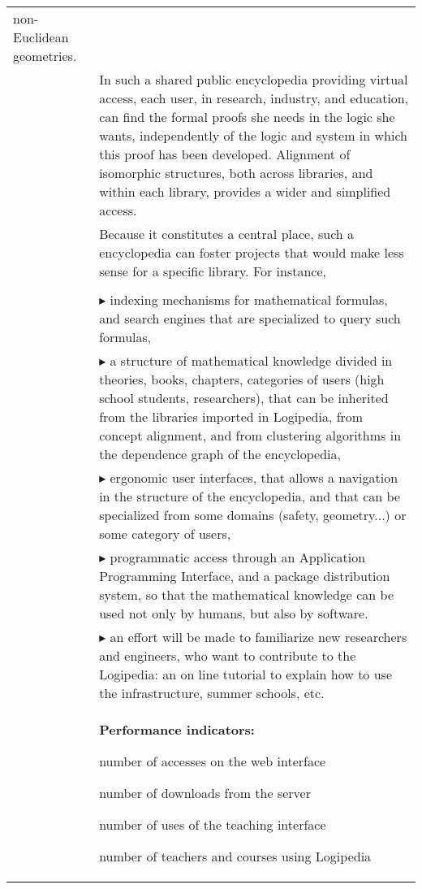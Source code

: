 \begin{longtable}{|p{}|p{}|}
non-Euclidean geometries.\\
&
\hspace{0.4cm}
In such a shared public encyclopedia providing virtual access, each
user, in research, industry, and education, can find the formal proofs
she needs in the logic she wants, independently of the logic and system in
which this
proof has been developed.  Alignment of isomorphic structures, both
across libraries, and
within each library, provides a wider and simplified access.\\
&
\hspace{0.4cm}
Because it constitutes a central place, such a encyclopedia can foster
projects that would make less sense for a specific library. For instance,\\
\\
&
$\blacktriangleright$
indexing mechanisms for mathematical formulas, and search engines
  that are specialized to query such formulas,
\\
&
$\blacktriangleright$
a structure of mathematical knowledge divided in theories, books,
    chapters, categories of users (high school students, researchers),
    that can be inherited from the libraries imported in
      Logipedia, from concept alignment, and from clustering
    algorithms in the dependence graph of the encyclopedia,
\\
&
$\blacktriangleright$
  ergonomic user interfaces, that allows a navigation in the
    structure of the encyclopedia, and that can be specialized from
    some domains (safety, geometry...) or some category of users,
\\
&
$\blacktriangleright$ programmatic access through an Application Programming
    Interface, and a package distribution system, so that the
    mathematical knowledge can be used not only by humans, but also by
    software.
\\
&
$\blacktriangleright$
an effort will be made to familiarize new researchers and engineers,
who want to contribute to the Logipedia:
an on line tutorial to explain how to use the infrastructure,
summer schools, etc.
\\
&
\colorbox{color2}{\bf Performance indicators:}
\begin{compactitem}
\item number of accesses on the web interface
\item number of downloads from the server
\item number of uses of the teaching interface
\item number of teachers and courses using Logipedia
\end{compactitem}


\end{longtable}
